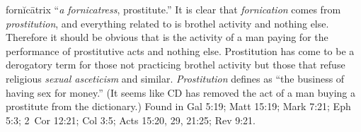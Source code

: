 fornĭcātrix ``\emph{a fornicatress}, prostitute.'' 
It is clear that \emph{fornication} comes from \emph{prostitution}, and everything related to  is brothel activity and nothing else. Therefore it should be obvious that  is the activity of a man paying for the performance of prostitutive acts and nothing else. Prostitution has come to be a derogatory term for those not practicing brothel activity but those that refuse religious \emph{sexual asceticism} and similar. \emph{Prostitution} defines as ``the business of having sex for money.'' (It seems like CD has removed the act of a man buying a prostitute from the dictionary.)
Found in Gal 5:19; Matt 15:19; Mark 7:21; Eph 5:3; 2~Cor 12:21; Col 3:5; Acts 15:20, 29, 21:25; Rev 9:21.
